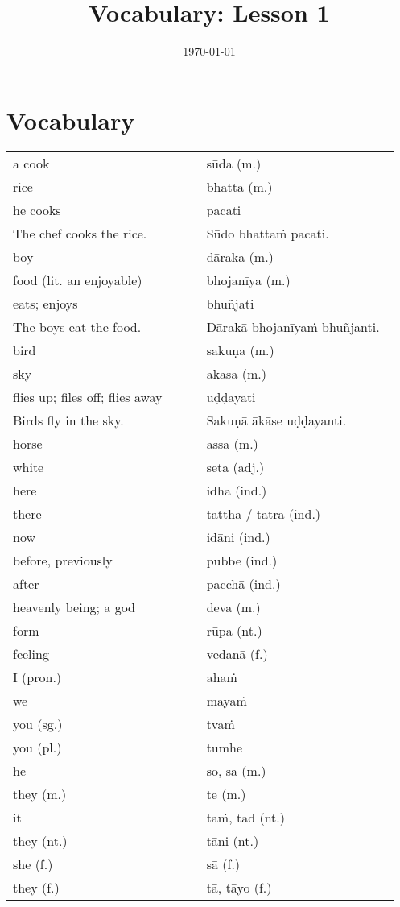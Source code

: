 \documentclass[a5paper]{memoir}
\date{\today}
\title{Vocabulary: Lesson 1}
\begin{document}
\chapter{Vocabulary}
\label{sec:org377b529}

\begin{longtable}{L{0.48\linewidth} L{0.48\linewidth}}
a cook & sūda (m.)\\[0pt]
rice & bhatta (m.)\\[0pt]
he cooks & pacati\\[0pt]
The chef cooks the rice. & Sūdo bhattaṁ pacati.\\[0pt]
boy & dāraka (m.)\\[0pt]
food (lit. an enjoyable) & bhojanīya (m.)\\[0pt]
eats; enjoys & bhuñjati\\[0pt]
The boys eat the food. & Dārakā bhojanīyaṁ bhuñjanti.\\[0pt]
bird & sakuṇa (m.)\\[0pt]
sky & ākāsa (m.)\\[0pt]
flies up; files off; flies away & uḍḍayati\\[0pt]
Birds fly in the sky. & Sakuṇā ākāse uḍḍayanti.\\[0pt]
horse & assa (m.)\\[0pt]
white & seta (adj.)\\[0pt]
here & idha (ind.)\\[0pt]
there & tattha / tatra (ind.)\\[0pt]
now & idāni (ind.)\\[0pt]
before, previously & pubbe (ind.)\\[0pt]
after & pacchā (ind.)\\[0pt]
heavenly being; a god & deva (m.)\\[0pt]
form & rūpa (nt.)\\[0pt]
feeling & vedanā (f.)\\[0pt]
I (pron.) & ahaṁ\\[0pt]
we & mayaṁ\\[0pt]
you (sg.) & tvaṁ\\[0pt]
you (pl.) & tumhe\\[0pt]
he & so, sa (m.)\\[0pt]
they (m.) & te (m.)\\[0pt]
it & taṁ, tad (nt.)\\[0pt]
they (nt.) & tāni (nt.)\\[0pt]
she (f.) & sā (f.)\\[0pt]
they (f.) & tā, tāyo (f.)\\[0pt]

\end{longtable}
\end{document}
